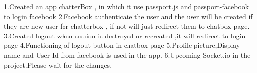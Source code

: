 1.Created an app chatterBox , in which it use passport.js and passport-facebook to login facebook
2.Facebook authenticate the user and the user will be created if they are new user for chatterbox , 
if not will just redirect them to chatbox page.
3.Created logout when session is destroyed or recreated ,it will redirect to login page
4.Functioning of logout button in chatbox page
5.Profile picture,Display name and User Id from facebook is used in the app.
6.Upcoming Socket.io in the project.Please wait for the changes.
